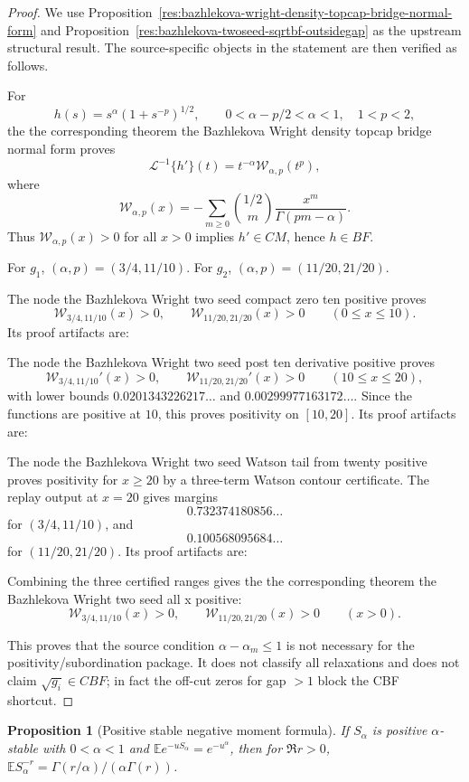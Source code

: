 \documentclass[11pt]{article}
\numberwithin{equation}{section}
\newtheorem{proposition}[theorem]{Proposition}
\theoremstyle{definition}
\theoremstyle{remark}
\newcommand{\1}{\mathbf 1}
\begin{document}
\begin{proof}
We use Proposition~\ref{res:bazhlekova-wright-density-topcap-bridge-normal-form} and Proposition~\ref{res:bazhlekova-twoseed-sqrtbf-outsidegap} as the upstream structural result. The source-specific objects in the statement are then verified as follows.

For
\[
h(s)=s^\alpha(1+s^{-p})^{1/2},\qquad 0<\alpha-p/2<\alpha<1,\quad 1<p<2,
\]
the the corresponding theorem the Bazhlekova Wright density topcap bridge normal form proves
\[
\mathcal L^{-1}\{h'\}(t)=t^{-\alpha}\mathcal W_{\alpha,p}(t^p),
\]
where
\[
\mathcal W_{\alpha,p}(x)=
-\sum_{m\ge0}\binom{1/2}{m}\frac{x^m}{\Gamma(pm-\alpha)}.
\]
Thus \(\mathcal W_{\alpha,p}(x)>0\) for all \(x>0\) implies \(h'\in CM\), hence \(h\in BF\).

For \(g_1\), \((\alpha,p)=(3/4,11/10)\). For \(g_2\), \((\alpha,p)=(11/20,21/20)\).

The node the Bazhlekova Wright two seed compact zero ten positive proves
\[
\mathcal W_{3/4,11/10}(x)>0,\qquad
\mathcal W_{11/20,21/20}(x)>0
\qquad(0\le x\le10).
\]
Its proof artifacts are:

The node the Bazhlekova Wright two seed post ten derivative positive proves
\[
\mathcal W_{3/4,11/10}'(x)>0,\qquad
\mathcal W_{11/20,21/20}'(x)>0
\qquad(10\le x\le20),
\]
with lower bounds \(0.0201343226217\ldots\) and \(0.00299977163172\ldots\). Since the functions are positive at \(10\), this proves positivity on \([10,20]\). Its proof artifacts are:

The node the Bazhlekova Wright two seed Watson tail from twenty positive proves positivity for \(x\ge20\) by a three-term Watson contour certificate. The replay output at \(x=20\) gives margins
\[
0.732374180856\ldots
\]
for \((3/4,11/10)\), and
\[
0.100568095684\ldots
\]
for \((11/20,21/20)\). Its proof artifacts are:

Combining the three certified ranges gives the the corresponding theorem the Bazhlekova Wright two seed all x positive:
\[
\mathcal W_{3/4,11/10}(x)>0,\qquad
\mathcal W_{11/20,21/20}(x)>0
\qquad(x>0).
\]

This proves that the source condition \(\alpha-\alpha_m\le1\) is not necessary for the positivity/subordination package. It does not classify all relaxations and does not claim \(\sqrt{g_i}\in CBF\); in fact the off-cut zeros for gap \(>1\) block the CBF shortcut.
\end{proof}

\begin{proposition}[Positive stable negative moment formula]
\label{res:positivestable-negativemoment}
If \(S_\alpha\) is positive \(\alpha\)-stable with \(0<\alpha<1\) and \(\mathbb E e^{-uS_\alpha}=e^{-u^\alpha}\), then for \(\Re r>0\), \(\mathbb E S_\alpha^{-r}=\Gamma(r/\alpha)/(\alpha\Gamma(r))\).
\end{proposition}
\end{document}
